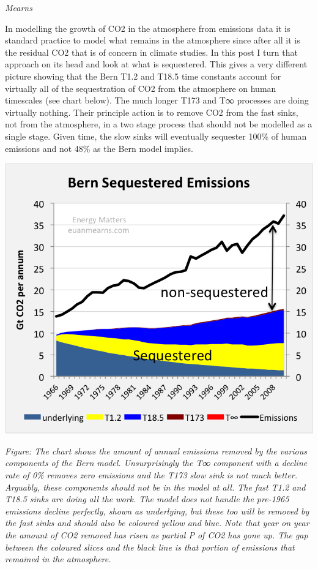 \documentclass[
]{book}
\begin{document}
\emph{Mearns}

In modelling the growth of CO2 in the atmosphere from emissions data it is standard practice to model what remains in the atmosphere since after all it is the residual CO2 that is of concern in climate studies. In this post I turn that approach on its head and look at what is sequestered. This gives a very different picture showing that the Bern T1.2 and T18.5 time constants account for virtually all of the sequestration of CO2 from the atmosphere on human timescales (see chart below). The much longer T173 and T∞ processes are doing virtually nothing. Their principle action is to remove CO2 from the fast sinks, not from the atmosphere, in a two stage process that should not be modelled as a single stage. Given time, the slow sinks will eventually sequester 100\% of human emissions and not 48\% as the Bern model implies.

\includegraphics{fig/bern_sequestered.png}

\emph{Figure: The chart shows the amount of annual emissions removed by the various components of the Bern model. Unsurprisingly the T∞ component with a decline rate of 0\% removes zero emissions and the T173 slow sink is not much better. Arguably, these components should not be in the model at all. The fast T1.2 and T18.5 sinks are doing all the work. The model does not handle the pre-1965 emissions decline perfectly, shown as underlying, but these too will be removed by the fast sinks and should also be coloured yellow and blue. Note that year on year the amount of CO2 removed has risen as partial P of CO2 has gone up. The gap between the coloured slices and the black line is that portion of emissions that remained in the atmosphere.}
\end{document}
